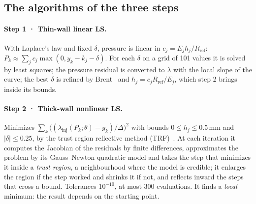 \subsection{The algorithms of the three steps}
\begin{table}[H]\centering\small
\caption{Tube-level computation blocks. ``Linear'' refers to the dependence of the model on the unknowns.}\label{tab:bloques}
\end{table}

\paragraph{Step 1 · Thin-wall linear LS.} With Laplace's law and fixed $\delta$, pressure is linear in $c_j=E_jh_j/R_{\mathrm{ref}}$: $P_k\approx\sum_jc_j\max(0,y_k-k_j-\delta)$. For each $\delta$ on a grid of 101 values it is solved by least squares; the pressure residual is converted to $\lambda$ with the local slope of the curve; the best $\delta$ is refined by Brent~\cite{brent} and $h_j=c_jR_{\mathrm{ref}}/E_j$, which step 2 brings inside its bounds.

\paragraph{Step 2 · Thick-wall nonlinear LS.} Minimizes $\sum_k\bigl((\lambda_{\mathrm{inj}}(P_k;\theta)-y_k)/\Delta\bigr)^2$ with bounds $0\le h_j\le0.5$\,mm and $|\delta|\le0.25$, by the trust region reflective method (TRF)~\cite{branch}. At each iteration it computes the Jacobian of the residuals by finite differences, approximates the problem by its Gauss--Newton quadratic model and takes the step that minimizes it inside a \emph{trust region}, a neighbourhood where the model is credible; it enlarges the region if the step worked and shrinks it if not, and reflects inward the steps that cross a bound. Tolerances $10^{-10}$, at most 300 evaluations. It finds a \emph{local} minimum: the result depends on the starting point.

